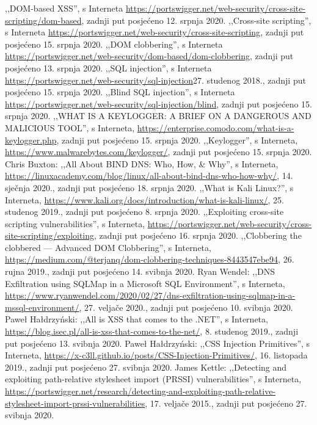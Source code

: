\documentclass[12pt, oneside, onecolumn]{book}
\begin{document}
{\begin{spacing}{1}
\begin{thebibliography}{99}
	 ,,DOM-based XSS'', s Interneta \url{https://portswigger.net/web-security/cross-site-scripting/dom-based}, zadnji put posjećeno 12. srpnja 2020.
	 ,,Cross-site scripting'', s Interneta \url{https://portswigger.net/web-security/cross-site-scripting}, zadnji put posjećeno 15. srpnja 2020.
	 ,,DOM clobbering'', s Interneta \url{https://portswigger.net/web-security/dom-based/dom-clobbering}, zadnji put posjećeno 13. srpnja 2020.
	 ,,SQL injection'', s Interneta \url{https://portswigger.net/web-security/sql-injection}27. studenog 2018., zadnji put posjećeno 15. srpnja 2020.
	 ,,Blind SQL injection'', s Interneta \url{https://portswigger.net/web-security/sql-injection/blind}, zadnji put posjećeno 15. srpnja 2020.
	 ,,WHAT IS A KEYLOGGER: A BRIEF ON A DANGEROUS AND MALICIOUS TOOL'', s Interneta, \url{https://enterprise.comodo.com/what-is-a-keylogger.php}, zadnji put posjećeno 15. srpnja 2020.
	 ,,Keylogger'', s Interneta, \url{https://www.malwarebytes.com/keylogger/}, zadnji put posjećeno 15. srpnja 2020.
	 Chris Buxton: ,,All About BIND DNS: Who, How, \& Why'', s Interneta, \url{https://linuxacademy.com/blog/linux/all-about-bind-dns-who-how-why/}, 14. sječnja 2020., zadnji put posjećeno 18. srpnja 2020.
	 ,,What is Kali Linux?'', s Interneta, \url{https://www.kali.org/docs/introduction/what-is-kali-linux/}, 25. studenog 2019., zadnji put posjećeno 8. srpnja 2020.
	 ,,Exploiting cross-site scripting vulnerabilities'', s Interneta, \url{https://portswigger.net/web-security/cross-site-scripting/exploiting}, zadnji put posjećeno 16. srpnja 2020.
	 ,,Clobbering the clobbered — Advanced DOM Clobbering'', s Interneta, \url{https://medium.com/@terjanq/dom-clobbering-techniques-8443547ebe94}, 26. rujna 2019., zadnji put posjećeno 14. svibnja 2020.
	 Ryan Wendel: ,,DNS Exfiltration using SQLMap in a Microsoft SQL Environment'', s Interneta, \url{https://www.ryanwendel.com/2020/02/27/dns-exfiltration-using-sqlmap-in-a-mssql-environment/}, 27. veljače 2020., zadnji put posjećeno 10. svibnja 2020.
	 Paweł Hałdrzyński: ,,All is XSS that comes to the .NET'', s Interneta, \url{https://blog.isec.pl/all-is-xss-that-comes-to-the-net/}, 8. studenog 2019., zadnji put posjećeno 13. svibnja 2020.
	 Paweł Hałdrzyński: ,,CSS Injection Primitives'', s Interneta, \url{https://x-c3ll.github.io/posts/CSS-Injection-Primitives/}, 16. listopada 2019., zadnji put posjećeno 27. svibnja 2020.
	 James Kettle: ,,Detecting and exploiting path-relative stylesheet import (PRSSI) vulnerabilities'', s Interneta, \url{https://portswigger.net/research/detecting-and-exploiting-path-relative-stylesheet-import-prssi-vulnerabilities}, 17. veljače 2015., zadnji put posjećeno 27. svibnja 2020.
	

\end{thebibliography}
\end{spacing}}
\end{document}
